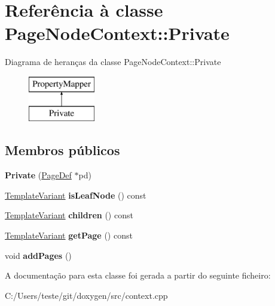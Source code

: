 \hypertarget{class_page_node_context_1_1_private}{\section{Referência à classe Page\-Node\-Context\-:\-:Private}
\label{class_page_node_context_1_1_private}
}
Diagrama de heranças da classe Page\-Node\-Context\-:\-:Private\begin{figure}[H]
\begin{center}
\leavevmode
\includegraphics[height=2.000000cm]{class_page_node_context_1_1_private}
\end{center}
\end{figure}
\subsection*{Membros públicos}
\begin{DoxyCompactItemize}
\item 
\hypertarget{class_page_node_context_1_1_private_ac1f774bae72ba41b81946496c407f947}{{\bfseries Private} (\hyperlink{class_page_def}{Page\-Def} $\ast$pd)}\label{class_page_node_context_1_1_private_ac1f774bae72ba41b81946496c407f947}

\item 
\hypertarget{class_page_node_context_1_1_private_a294b828ee5cfccceb76c68a2a2c94965}{\hyperlink{class_template_variant}{Template\-Variant} {\bfseries is\-Leaf\-Node} () const }\label{class_page_node_context_1_1_private_a294b828ee5cfccceb76c68a2a2c94965}

\item 
\hypertarget{class_page_node_context_1_1_private_aca10906ad6f957c2696e917548979f46}{\hyperlink{class_template_variant}{Template\-Variant} {\bfseries children} () const }\label{class_page_node_context_1_1_private_aca10906ad6f957c2696e917548979f46}

\item 
\hypertarget{class_page_node_context_1_1_private_a1272d1dda48981097de5dcd542b212fb}{\hyperlink{class_template_variant}{Template\-Variant} {\bfseries get\-Page} () const }\label{class_page_node_context_1_1_private_a1272d1dda48981097de5dcd542b212fb}

\item 
\hypertarget{class_page_node_context_1_1_private_a32ce823f39bfa99694e36b727d31d289}{void {\bfseries add\-Pages} ()}\label{class_page_node_context_1_1_private_a32ce823f39bfa99694e36b727d31d289}

\end{DoxyCompactItemize}


A documentação para esta classe foi gerada a partir do seguinte ficheiro\-:\begin{DoxyCompactItemize}
\item 
C\-:/\-Users/teste/git/doxygen/src/context.\-cpp\end{DoxyCompactItemize}
